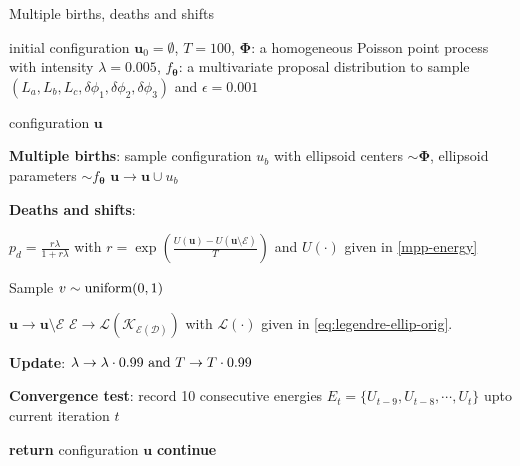 \documentclass[journal]{IEEEtran}
\begin{document}
\begin{algorithm}
  \caption{Multiple births, deaths and shifts}
  \label{algo-mbds}
  \begin{algorithmic}[1]

    \REQUIRE initial configuration $\mathbf{u}_0 = \emptyset$,
    $T = 100$, $\mathbf{\Phi}$: a homogeneous Poisson point process
    with intensity $\lambda = 0.005$, $f_{\boldsymbol{\theta}}$: a
    multivariate proposal distribution to sample
    $ \left( L_a, L_b, L_c, \delta{\phi_1}, \delta{\phi_2},
      \delta{\phi_3} \right)$ and $\epsilon = 0.001$

    \ENSURE configuration $\mathbf{u}$

    \vspace{1mm} \REPEAT

    \vspace{1mm} \STATE \textbf{Multiple births}: sample configuration
    $u_b$ with ellipsoid centers $\sim \mathbf{\Phi}$, ellipsoid
    parameters $\sim f_{\boldsymbol{\theta}}$ \label{itr} \STATE
    $\mathbf{u} \rightarrow \mathbf{u} \cup u_b$

    \vspace{1mm} \STATE \textbf{Deaths and shifts}:

     \STATE
    $p_d = \frac{r\lambda}{1 + r\lambda}$ with
    $r = \exp \left( \frac{ U(\mathbf{u}) - U(\mathbf{u} \setminus
        \mathcal{E}) }{T} \right)$ and $U(\cdot)$ given in
    \eqref{mpp-energy}

    \STATE Sample $v \sim \textnormal{uniform}(0, 1)$

     \STATE
    $\mathbf{u} \rightarrow \mathbf{u} \setminus \mathcal{E}$ \ELSE
    \STATE
    $\mathcal{E} \rightarrow
    \mathcal{L(K_{\mathcal{E}(\mathcal{D})})}$ with
    $\mathcal{L}(\cdot)$ given in \eqref{eq:legendre-ellip-orig}.
    \ENDIF

    \ENDFOR

    \vspace{1mm} \STATE \textbf{Update}:
    $\lambda \rightarrow \lambda \cdot 0.99 \textnormal{ and } T
    \rightarrow T \cdot 0.99$

    \vspace{1mm} \STATE \textbf{Convergence test}: record 10
    consecutive energies $E_t = \{U_{t-9}, U_{t-8}, \cdots, U_{t}\}$
    upto current iteration $t$

     \STATE \textbf{return} configuration $\mathbf{u}$
    \ELSE \STATE \textbf{continue}
    \ENDIF

  \end{algorithmic}
\end{algorithm}
\end{document}
